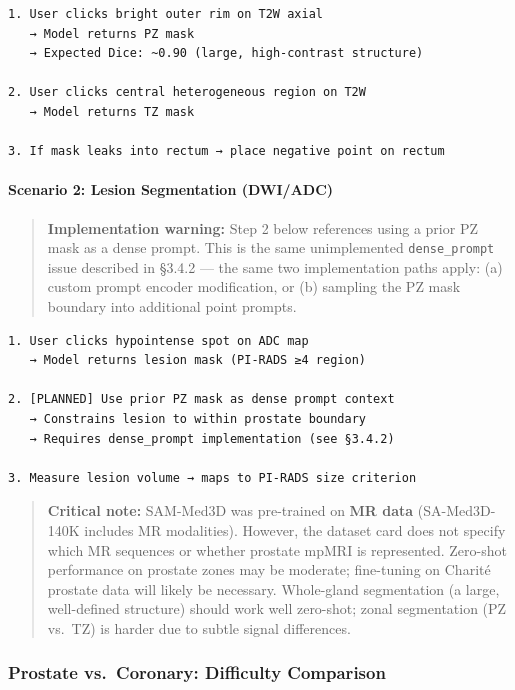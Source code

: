 \documentclass[
  11pt,
]{article}
\begin{document}
\begin{verbatim}
1. User clicks bright outer rim on T2W axial
   → Model returns PZ mask
   → Expected Dice: ~0.90 (large, high-contrast structure)

2. User clicks central heterogeneous region on T2W
   → Model returns TZ mask

3. If mask leaks into rectum → place negative point on rectum
\end{verbatim}

\paragraph{Scenario 2: Lesion Segmentation
(DWI/ADC)}\label{scenario-2-lesion-segmentation-dwiadc}

\begin{quote}
\textbf{Implementation warning:} Step 2 below references using a prior
PZ mask as a dense prompt. This is the same unimplemented
\texttt{dense\_prompt} issue described in §3.4.2 --- the same two
implementation paths apply: (a) custom prompt encoder modification, or
(b) sampling the PZ mask boundary into additional point prompts.
\end{quote}

\begin{verbatim}
1. User clicks hypointense spot on ADC map
   → Model returns lesion mask (PI-RADS ≥4 region)

2. [PLANNED] Use prior PZ mask as dense prompt context
   → Constrains lesion to within prostate boundary
   → Requires dense_prompt implementation (see §3.4.2)

3. Measure lesion volume → maps to PI-RADS size criterion
\end{verbatim}

\begin{quote}
\textbf{Critical note:} SAM-Med3D was pre-trained on \textbf{MR data}
(SA-Med3D-140K includes MR modalities). However, the dataset card does
not specify which MR sequences or whether prostate mpMRI is represented.
Zero-shot performance on prostate zones may be moderate; fine-tuning on
Charité prostate data will likely be necessary. Whole-gland segmentation
(a large, well-defined structure) should work well zero-shot; zonal
segmentation (PZ vs.~TZ) is harder due to subtle signal differences.
\end{quote}

\subsubsection{Prostate vs.~Coronary: Difficulty
Comparison}\label{prostate-vs.-coronary-difficulty-comparison}
\end{document}
